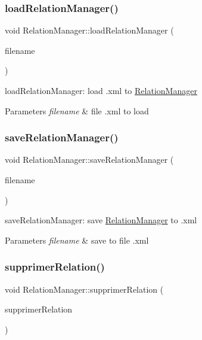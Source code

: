 \subsubsection{\texorpdfstring{load\+Relation\+Manager()}{loadRelationManager()}}
{\footnotesize\ttfamily void Relation\+Manager\+::load\+Relation\+Manager (\begin{DoxyParamCaption}\item[{const Q\+String \&}]{filename }\end{DoxyParamCaption})}



load\+Relation\+Manager\+: load .xml to \hyperlink{class_relation_manager}{Relation\+Manager} 


\begin{DoxyParams}{Parameters}
{\em filename} & file .xml to load \\
\hline
\end{DoxyParams}
\mbox{\label{class_relation_manager_af12e8c983fdf15a3e84ec826c150fbea}} 
\subsubsection{\texorpdfstring{save\+Relation\+Manager()}{saveRelationManager()}}
{\footnotesize\ttfamily void Relation\+Manager\+::save\+Relation\+Manager (\begin{DoxyParamCaption}\item[{const Q\+String \&}]{filename }\end{DoxyParamCaption})}



save\+Relation\+Manager\+: save \hyperlink{class_relation_manager}{Relation\+Manager} to .xml 


\begin{DoxyParams}{Parameters}
{\em filename} & save to file .xml \\
\hline
\end{DoxyParams}
\mbox{\label{class_relation_manager_a1ab185cfa12b8632d44c7f705d0168f1}} 
\subsubsection{\texorpdfstring{supprimer\+Relation()}{supprimerRelation()}}
{\footnotesize\ttfamily void Relation\+Manager\+::supprimer\+Relation (\begin{DoxyParamCaption}\item[{\hyperlink{class_relation}{Relation} $\ast$}]{supprimer\+Relation }\end{DoxyParamCaption})}



